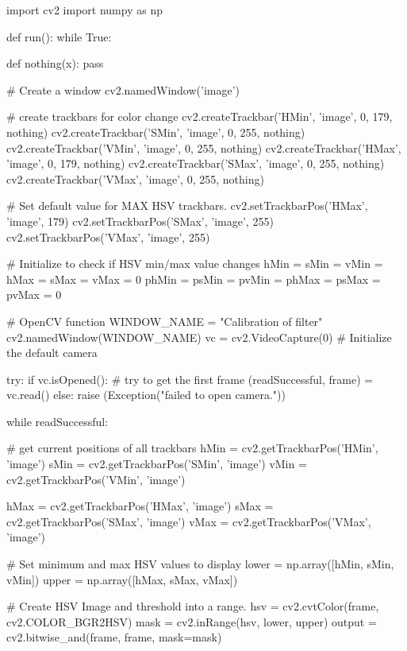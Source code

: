 \begin{pyverbatim}
import cv2
import numpy as np


def run():
    while True:

        def nothing(x):
            pass

        # Create a window
        cv2.namedWindow('image')

        # create trackbars for color change
        cv2.createTrackbar('HMin', 'image', 0, 179, nothing)
        cv2.createTrackbar('SMin', 'image', 0, 255, nothing)
        cv2.createTrackbar('VMin', 'image', 0, 255, nothing)
        cv2.createTrackbar('HMax', 'image', 0, 179, nothing)
        cv2.createTrackbar('SMax', 'image', 0, 255, nothing)
        cv2.createTrackbar('VMax', 'image', 0, 255, nothing)

        # Set default value for MAX HSV trackbars.
        cv2.setTrackbarPos('HMax', 'image', 179)
        cv2.setTrackbarPos('SMax', 'image', 255)
        cv2.setTrackbarPos('VMax', 'image', 255)

        # Initialize to check if HSV min/max value changes
        hMin = sMin = vMin = hMax = sMax = vMax = 0
        phMin = psMin = pvMin = phMax = psMax = pvMax = 0

        # OpenCV function
        WINDOW_NAME = "Calibration of filter"
        cv2.namedWindow(WINDOW_NAME)
        vc = cv2.VideoCapture(0)  # Initialize the default camera

        try:
            if vc.isOpened():  # try to get the first frame
                (readSuccessful, frame) = vc.read()
            else:
                raise (Exception("failed to open camera."))

            while readSuccessful:

                # get current positions of all trackbars
                hMin = cv2.getTrackbarPos('HMin', 'image')
                sMin = cv2.getTrackbarPos('SMin', 'image')
                vMin = cv2.getTrackbarPos('VMin', 'image')

                hMax = cv2.getTrackbarPos('HMax', 'image')
                sMax = cv2.getTrackbarPos('SMax', 'image')
                vMax = cv2.getTrackbarPos('VMax', 'image')

                # Set minimum and max HSV values to display
                lower = np.array([hMin, sMin, vMin])
                upper = np.array([hMax, sMax, vMax])

                # Create HSV Image and threshold into a range.
                hsv = cv2.cvtColor(frame, cv2.COLOR_BGR2HSV)
                mask = cv2.inRange(hsv, lower, upper)
                output = cv2.bitwise_and(frame, frame, mask=mask)


\end{pyverbatim}
